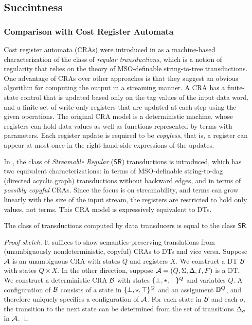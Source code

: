 \subsection{Succintness}
\label{sec:succinctness}

\subsubsection{Comparison with Cost Register Automata}
\label{subsec:dts-and-cras}

\newcommand{\SR}{\mathsf{SR}}

Cost register automata (CRAs) were introduced in \cite{AdADRY2013CRA} as a machine-based characterization of the class of \emph{regular transductions}, which is a notion of regularity that relies on the theory of MSO-definable string-to-tree transductions. One advantage of CRAs over other approaches is that they suggest an obvious algorithm for computing the output in a streaming manner. A CRA has a finite-state control that is updated based only on the tag values of the input data word, and a finite set of write-only registers that are updated at each step using the given operations. The original CRA model is a deterministic machine, whose registers can hold data values as well as functions represented by terms with parameters. Each register update is required to be \emph{copyless}, that is, a register can appear at most once
in the right-hand-side expressions of the updates.

In \cite{arXiv2018}, the class of \emph{Streamable Regular} ($\SR$) transductions is introduced, which has two equivalent characterizations: in terms of MSO-definable string-to-dag (directed acyclic graph) transductions without backward edges, and in terms of \emph{possibly copyful} CRAs. Since the focus is on streamability, and terms can grow linearly with the size of the input stream, the registers are restricted to hold only values, not terms. This CRA model is expressively equivalent to DTs.

\begin{theorem}
\label{thm:dt-expressiveness}
The class of transductions computed by data transducers is equal to the class $\SR$.
\end{theorem}
\begin{proof}[Proof sketch]
It suffices to show semantics-preserving translations from (unambiguously nondeterministic, copyful) CRAs to DTs and vice versa. Suppose $\mathcal{A}$ is an unambiguous CRA with states $Q$ and registers $X$. We construct a DT $\mathcal{B}$ with states $Q \times X$. In the other direction, suppose $\mathcal{A} = (Q, \Sigma, \Delta, I, F)$ is a DT. We construct a deterministic CRA $\mathcal{B}$ with states $\{\bot,\star,\top\}^Q$ and variables $Q$. A configuration of $\mathcal{B}$ consists of a state in $\{\bot,\star,\top\}^Q$ and an assignment $\mathbb{D}^Q$, and therefore uniquely specifies a configuration of $\mathcal{A}$. For each state in $\mathcal{B}$ and each $\sigma$, the transition to the next state can be determined from the set of transitions $\Delta_\sigma$ in $\mathcal{A}$.
\end{proof}

